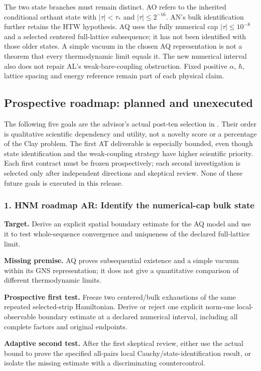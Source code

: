 The two state branches must remain distinct. AO refers to the inherited conditional orthant state with $|\tau|<\tau_*$ and $|\tau|\le2^{-16}$. AN's bulk identification further retains the HTW hypothesis. AQ uses the fully numerical cap $|\tau|\le10^{-8}$ and a selected centered full-lattice subsequence; it has not been identified with those older states. A simple vacuum in the chosen AQ representation is not a theorem that every thermodynamic limit equals it. The new numerical interval also does not repair AL's weak-bare-coupling obstruction. Fixed positive $\alpha$, $\hbar$, lattice spacing and energy reference remain part of each physical claim.

\subsection{Prospective roadmap: planned and unexecuted}
The following five goals are the advisor's actual post-ten selection in . Their order is qualitative scientific dependency and utility, not a novelty score or a percentage of the Clay problem. The first AT deliverable is especially bounded, even though state identification and the weak-coupling strategy have higher scientific priority. Each first contract must be frozen prospectively; each second investigation is selected only after independent directions and skeptical review. None of these future goals is executed in this release.
\subsubsection{1. HNM roadmap AR: Identify the numerical-cap bulk state}
\textbf{Target.} Derive an explicit spatial boundary estimate for the AQ model and use it to test whole-sequence convergence and uniqueness of the declared full-lattice limit.

\textbf{Missing premise.} AQ proves subsequential existence and a simple vacuum within its GNS representation; it does not give a quantitative comparison of different thermodynamic limits.

\textbf{Prospective first test.} Freeze two centered/bulk exhaustions of the same repeated selected-strip Hamiltonian. Derive or reject one explicit norm-one local-observable boundary estimate at a declared numerical interval, including all complete factors and original endpoints.

\textbf{Adaptive second test.} After the first skeptical review, either use the actual bound to prove the specified all-pairs local Cauchy/state-identification result, or isolate the missing estimate with a discriminating countercontrol.

